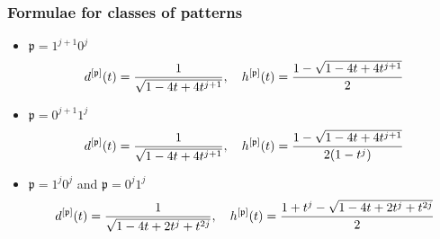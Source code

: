\documentclass{beamer}
\begin{document}



\begin{frame}\frametitle{Formulae for classes of patterns}
{\small
\begin{itemize}
\item $\mathfrak{p}=1^{j+1}0^j$
$$ d^{[\mathfrak{p}]}(t)={1 \over \sqrt{1-4t+4t^{j+1}}}, \quad h^{[\mathfrak{p}]}(t)={1 -\sqrt{1-4t+4t^{j+1}} \over 2 }$$
\item $\mathfrak{p}=0^{j+1}1^j$
$$ d^{[\mathfrak{p}]}(t)={1 \over \sqrt{1-4t+4t^{j+1}}}, \quad h^{[\mathfrak{p}]}(t)={1 -\sqrt{1-4t+4t^{j+1}} \over 2(1-t^j) }$$
\item $\mathfrak{p}=1^{j}0^j$ and $\mathfrak{p}=0^{j}1^j$
$$ d^{[\mathfrak{p}]}(t)={1 \over \sqrt{1-4t+2t^j+t^{2j}}}, \quad h^{[\mathfrak{p}]}(t)={{1+t^j -\sqrt{1-4t+2t^j+t^{2j}} } \over 2 }$$
\end{itemize}
}
\end{frame}
\end{document}
